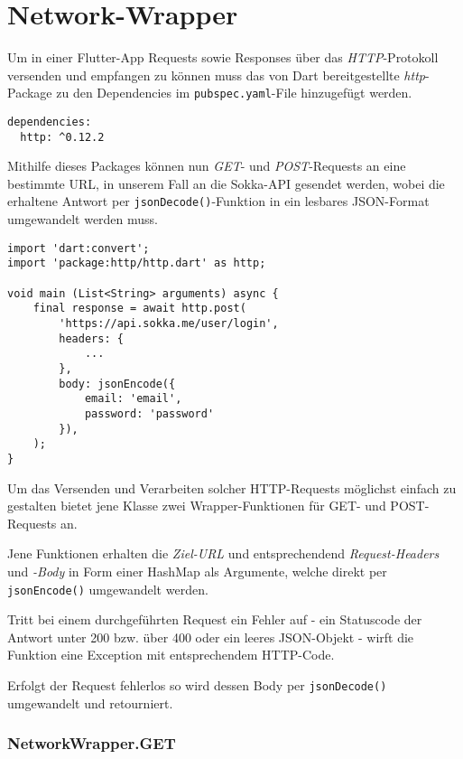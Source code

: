 \section{Network-Wrapper}

Um in einer Flutter-App Requests sowie Responses über das \textit{HTTP}-Protokoll versenden und empfangen zu können
muss das von Dart bereitgestellte \textit{http}-Package zu den Dependencies im \lstinline{pubspec.yaml}-File hinzugefügt
werden.

\begin{lstlisting}
dependencies:
  http: ^0.12.2
\end{lstlisting}

Mithilfe dieses Packages können nun \textit{GET}- und \textit{POST}-Requests an eine bestimmte URL, in unserem Fall
an die Sokka-API gesendet werden, wobei die erhaltene Antwort per \lstinline{jsonDecode()}-Funktion in ein lesbares
JSON-Format umgewandelt werden muss.

\begin{lstlisting}
import 'dart:convert';
import 'package:http/http.dart' as http;

void main (List<String> arguments) async {
    final response = await http.post(
        'https://api.sokka.me/user/login',
        headers: {
            ...
        },
        body: jsonEncode({
            email: 'email',
            password: 'password'
        }),
    );
}
\end{lstlisting}

Um das Versenden und Verarbeiten solcher HTTP-Requests möglichst einfach zu gestalten bietet jene
Klasse zwei Wrapper-Funktionen für GET- und POST-Requests an.

Jene Funktionen erhalten die \textit{Ziel-URL} und entsprechendend \textit{Request-Headers} und \textit{-Body} in Form einer HashMap
als Argumente, welche direkt per \lstinline{jsonEncode()} umgewandelt werden.

Tritt bei einem durchgeführten Request ein Fehler auf - ein Statuscode der Antwort unter 200 bzw. über 400 oder ein
leeres JSON-Objekt - wirft die Funktion eine Exception mit entsprechendem HTTP-Code.

Erfolgt der Request fehlerlos so wird dessen Body per \lstinline{jsonDecode()} umgewandelt und retourniert.

\subsubsection{NetworkWrapper.GET}

